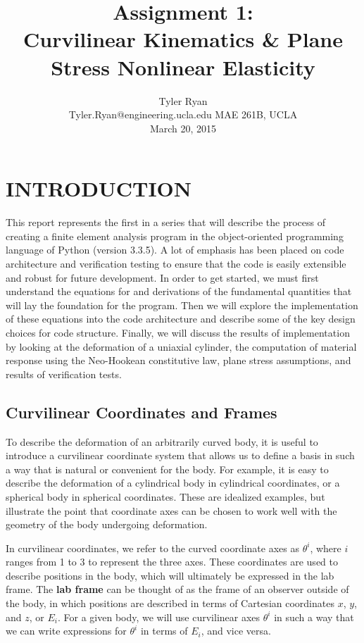 \documentclass[]{spie}  %
\title{Assignment 1: \\
	Curvilinear Kinematics \& Plane Stress Nonlinear Elasticity}
\author{Tyler Ryan \\
	Tyler.Ryan@engineering.ucla.edu
\skiplinehalf
MAE 261B, UCLA \\
March 20, 2015
}
\begin{document}
 
\maketitle 

\tableofcontents

\section{INTRODUCTION}
\label{section: introduction}  %

This report represents the first in a series that will describe the process of creating a finite element analysis program in the object-oriented programming language of Python (version 3.3.5). A lot of emphasis has been placed on code architecture and verification testing to ensure that the code is easily extensible and robust for future development. In order to get started, we must first understand the equations for and derivations of the fundamental quantities that will lay the foundation for the program. Then we will explore the implementation of these equations into the code architecture and describe some of the key design choices for code structure. Finally, we will discuss the results of implementation by looking at the deformation of a uniaxial cylinder, the computation of material response using the Neo-Hookean constitutive law, plane stress assumptions, and results of verification tests.

\subsection{Curvilinear Coordinates and Frames}

To describe the deformation of an arbitrarily curved body, it is useful to introduce a curvilinear coordinate system that allows us to define a basis in such a way that is natural or convenient for the body. For example, it is easy to describe the deformation of a cylindrical body in cylindrical coordinates, or a spherical body in spherical coordinates. These are idealized examples, but illustrate the point that coordinate axes can be chosen to work well with the geometry of the body undergoing deformation. 

In curvilinear coordinates, we refer to the curved coordinate axes as $\theta^i$, where $i$ ranges from 1 to 3 to represent the three axes. These coordinates are used to describe positions in the body, which will ultimately be expressed in the lab frame. The \textbf{lab frame} can be thought of as the frame of an observer outside of the body, in which positions are described in terms of Cartesian coordinates $x$, $y$, and $z$, or $E_i$. For a given body, we will use curvilinear axes $\theta^i$ in such a way that we can write expressions for $\theta^i$ in terms of $E_i$, and vice versa. 
\end{document}
